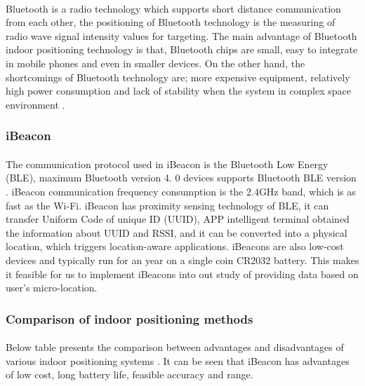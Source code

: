 \documentclass[12pt]{article}
\begin{document}
\paragraph{}Bluetooth is a radio technology which supports short distance communication from each other, the positioning of Bluetooth technology is the measuring of radio wave signal intensity values for targeting. The main advantage of Bluetooth indoor positioning technology is that, Bluetooth chips are small, easy to integrate in mobile phones and even in smaller devices. On the other hand, the shortcomings of Bluetooth technology are; more expensive equipment, relatively high power consumption and lack of stability when the system in complex space environment \cite{indoor}.

\subsubsection{iBeacon}
\paragraph{}The communication protocol used in iBeacon is the Bluetooth Low Energy (BLE), maximum Bluetooth version 4. 0 devices supports Bluetooth BLE version \cite{indoor}. iBeacon communication frequency consumption is the 2.4GHz band, which is as fast as the Wi-Fi. iBeacon has proximity sensing technology of BLE, it can transfer Uniform Code of unique ID (UUID), APP intelligent terminal obtained the information about UUID and RSSI, and it can be converted into a physical location, which triggers location-aware applications. iBeacons are also low-cost devices and typically run for an year on a single coin CR2032 battery. \cite{audioBeacon} This makes it feasible for us to implement iBeacons into out study of providing data based on user's micro-location.

\subsubsection{Comparison of indoor positioning methods}
\paragraph{} Below table presents the comparison between advantages and disadvantages of various indoor positioning systems \cite{sensing}. It can be seen that iBeacon has advantages of low cost, long battery life, feasible accuracy and range.  \cite{augmented}
\paragraph{}
\end{document}
